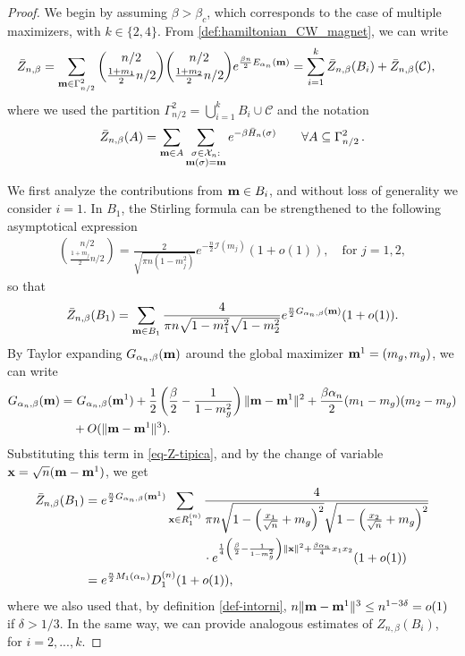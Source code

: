 \documentclass[11pt,oneside]{amsart}
\numberwithin{equation}{section}  %
\theoremstyle{plain}
\theoremstyle{remark}
\def \s {{\sigma}}
\def \bm {{\bf m}}
\begin{document}
\begin{proof}
We begin by assuming $\beta>\beta_c$, which corresponds to the case of multiple maximizers, with $k\in\{2,4\}$. 
From  \eqref{def:hamiltonian_CW_magnet}, we can write
\begin{align*}
    \bar{Z}_{n,\beta} &=\sum_{\bm \in \Gamma_{n/2}^2} \binom{n/2}{\frac{1+m_1}{2}n/2} \binom{n/2}{\frac{1+m_2}{2}n/2} e^{\frac{\beta n}{2} E_{\alpha_n}(\bm)} = \sum_{i=1}^k \bar{Z}_{n,\beta}(B_i) +  \bar{Z}_{n,\beta}(\mathcal{C}),
\end{align*}
where we used the partition $\Gamma_{n/2}^2=\bigcup_{i=1}^k B_i \cup \mathcal{C}$ and the notation
$$\bar{Z}_{n,\beta}(A)= \sum_{\bm \in A} \sum_{\substack{\s\in\mathcal{X}_n:\\\bm(\s)=\bm}}e^{-\beta \bar{H}_n(\s)}\qquad \forall A\subseteq \Gamma_{n/2}^2\,.$$

We first analyze the contributions from $\bm\in B_i$, and without loss of generality we consider $i=1$. 
In $B_1$, the Stirling formula can be strengthened to the following asymptotical expression
\begin{align}\label{eq-coeffbin}
    \binom{n/2}{\frac{1+m_j}{2} n/2}= \frac{2}{\sqrt{\pi n (1-m_j^2)}}e^{- \frac{n}{2}\mathcal{I}(m_j)}(1+o(1)),
    \quad\mbox{for } j=1,2,
\end{align}
so that
\begin{align}\label{eq-Z-tipica}
    \bar{Z}_{n,\beta}(B_1)=\sum_{\bm \in B_1} \frac{4}{\pi n \sqrt{1-m_1^2} \sqrt{1-m_2^2}}e^{\frac{n}{2}G_{\alpha_n,\beta}(\bm)} (1+o(1)).
\end{align}
By Taylor expanding $G_{\alpha_n,\beta}(\bm)$ around the global maximizer $\bm^1=(m_g,m_g)$, we can write
\begin{align}\label{taylor_G}
    G_{\alpha_n,\beta}(\bm)= & \,\,G_{\alpha_n,\beta}(\bm^1)+\frac{1}{2} \left ( \frac{\beta}{2}-\frac{1}{1-m_g^2} \right )  \| \bm-\bm^1 \|^2+\frac{\beta \alpha_n}{2}(m_1-m_g)(m_2-m_g) \notag \\
    &+ O(\|\bm-\bm^1\|^3).
\end{align}
%
Substituting this term in \eqref{eq-Z-tipica}, and by the change of variable ${\bf{x}}=\sqrt{n}({\bf{m}}-{\bf{m}}^{1})$, we get
\begin{equation}\label{eq-Z-tipica2}
\begin{split}
    \bar{Z}_{n,\beta}(B_1)
    &=e^{\frac{n}{2}G_{\alpha_n,\beta}(\bm^1)}\sum_{{\bf x} \in R_1^{(n)}} \frac{4}{\pi n \sqrt{1- \left (\frac{x_1}{\sqrt{n}}+m_g \right )^2} \sqrt{1- \left (\frac{x_2}{\sqrt{n}}+m_g \right )^2}}  \\
    & \qquad\qquad\qquad\qquad\quad\,\,\, \cdot e^{ \frac{1}{4} \left ( \frac{\beta}{2}-\frac{1}{1-m_g^2} \right ) \|{\bf x}\|^2  +\frac{\beta \alpha_n}{4} x_1x_2}(1+o(1))  \\
    &= e^{\frac{n}{2}M_1(\alpha_n)} D_1^{(n)} (1+o(1)), 
\end{split}
\end{equation}
where we also used that, by definition \eqref{def-intorni}, $n\|\bm-\bm^1\|^3\le n^{1-3\delta}=o(1)$ if $\delta>1/3$. 
In the same way, we can provide analogous estimates of $Z_{n,\beta}(B_i)$, for $i=2,...,k$. 


\end{proof}
\end{document}
